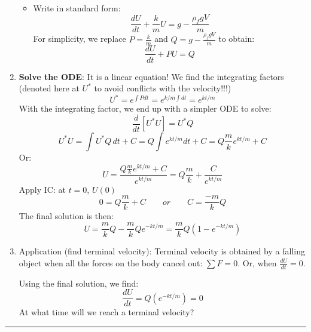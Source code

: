 \begin{enumerate}
\begin{itemize}
\begin{equation}
\end{equation}
\item Write in standard form:
\begin{equation}
\frac{dU}{dt}+\frac{k}{m}U=g-\frac{\rho_f g V}{m}
\end{equation}
For simplicity, we replace $P=\frac{k}{m}$ and $Q=g-\frac{\rho_f g V}{m}$ to obtain:
\begin{equation}
\frac{dU}{dt}+PU=Q
\end{equation}
\end{itemize}
\item \textbf{Solve the ODE}: It is a linear equation! We find the integrating factors (denoted here at $U^*$ to avoid conflicts with the velocity!!!)
\begin{equation}
U^*=e^{\int P dt}=e^{k/m\int dt}=e^{kt/m}
\end{equation}
With the integrating factor, we end up with a simpler ODE to solve:
\begin{equation}
\frac{d}{dt}\left[U^*U\right]=U^*Q
\end{equation}
\begin{equation}
U^*U = \int U^*Q\,dt+C=Q\int  e^{kt/m} dt+C=Q\frac{m}{k}e^{kt/m}+C
\end{equation}
Or:
\begin{equation}
U =\frac{Q\frac{m}{k}e^{kt/m}+C}{e^{kt/m}}=Q\frac{m}{k}+\frac{C}{e^{kt/m}}
\end{equation}
 Apply IC: at $t=0$, $U(0)$
\begin{equation}
0 =Q\frac{m}{k}+C \qquad or \qquad C=\frac{-m}{k}Q
\end{equation}
The final solution is then:
\begin{equation}
U =\frac{m}{k}Q-\frac{m}{k}Q{e^{-kt/m}}=\frac{m}{k}Q\left(1-e^{-kt/m}\right)
\end{equation}
\item Application (find terminal velocity): Terminal velocity is obtained by a falling object when all the forces on the body cancel out: $\sum F=0$. Or, when $\frac{dU}{dt}=0$.

Using the final solution, we find:
\begin{equation}
\frac{dU}{dt}=Q\left(e^{-kt/m}\right)=0
\end{equation}
At what time will we reach a terminal velocity?

\end{enumerate}

\begin{center}
\noindent\rule{4cm}{0.4pt}
\end{center}

